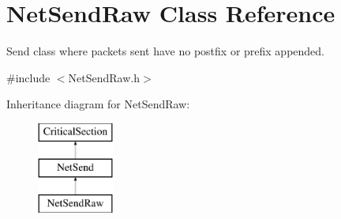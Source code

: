 \hypertarget{class_net_send_raw}{
\section{NetSendRaw Class Reference}
\label{class_net_send_raw}
}


Send class where packets sent have no postfix or prefix appended.  




{\ttfamily \#include $<$NetSendRaw.h$>$}

Inheritance diagram for NetSendRaw:\begin{figure}[H]
\begin{center}
\leavevmode
\includegraphics[height=3.000000cm]{class_net_send_raw}
\end{center}
\end{figure}
